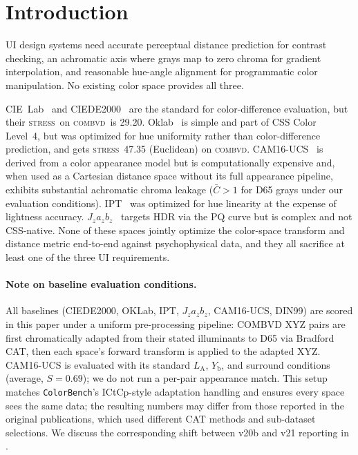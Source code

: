 \documentclass[11pt, twocolumn]{article}
\newcommand{\stress}{\textsc{stress}}
\newcommand{\combvd}{\textsc{combvd}}
\begin{document}
\section{Introduction}
\label{sec:intro}

UI design systems need accurate perceptual distance prediction for
contrast checking, an achromatic axis where grays map to zero chroma
for gradient interpolation, and reasonable hue-angle alignment for
programmatic color manipulation. No existing color space provides all
three.

CIE~Lab~\cite{cie1976} and CIEDE2000~\cite{luo2001} are the
standard for color-difference evaluation, but their
\stress\ on \combvd\ is 29.20.
Oklab~\cite{ottosson2020} is simple and part of CSS Color Level~4,
but was optimized for hue uniformity rather than color-difference
prediction, and gets \stress\ 47.35 (Euclidean) on \combvd.
CAM16-UCS~\cite{li2017} is derived from a color appearance model
but is computationally expensive and, when used as a Cartesian
distance space without its full appearance pipeline, exhibits
substantial achromatic chroma leakage ($\bar{C}>1$ for D65 grays
under our evaluation conditions).
IPT~\cite{ebner1998} was optimized for hue linearity at the expense
of lightness accuracy. $J_z a_z b_z$~\cite{safdar2017} targets HDR
via the PQ curve but is complex and not CSS-native. None of these
spaces jointly optimize the color-space transform and distance
metric end-to-end against psychophysical data, and they all
sacrifice at least one of the three UI requirements.

\paragraph{Note on baseline evaluation conditions.}
All baselines (CIEDE2000, OKLab, IPT, $J_z a_z b_z$, CAM16-UCS,
DIN99) are scored in this paper under a uniform pre-processing
pipeline: COMBVD XYZ pairs are first chromatically adapted from
their stated illuminants to D65 via Bradford CAT, then each space's
forward transform is applied to the adapted XYZ. CAM16-UCS is
evaluated with its standard $L_\mathrm{A}$, $Y_\mathrm{b}$, and
surround conditions (average, $S=0.69$); we do not run a per-pair
appearance match. This setup matches \texttt{ColorBench}'s
ICtCp-style adaptation handling and ensures every space sees the
same data; the resulting numbers may differ from those reported in
the original publications, which used different CAT methods and
sub-dataset selections. We discuss the corresponding shift between
v20b and v21 reporting in .
\end{document}
